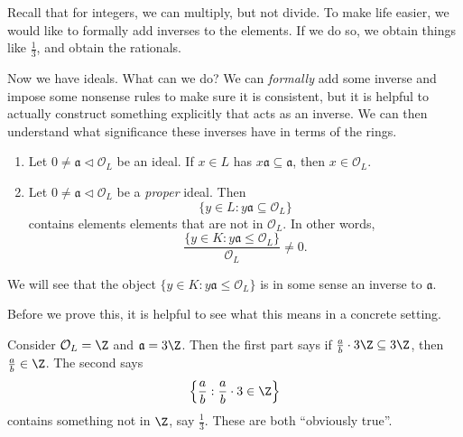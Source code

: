 \documentclass[a4paper]{article}
\begin{document}
Recall that for integers, we can multiply, but not divide. To make life easier, we would like to formally add inverses to the elements. If we do so, we obtain things like $\frac{1}{3}$, and obtain the rationals.

Now we have ideals. What can we do? We can \emph{formally} add some inverse and impose some nonsense rules to make sure it is consistent, but it is helpful to actually construct something explicitly that acts as an inverse. We can then understand what significance these inverses have in terms of the rings.

\begin{prop}\leavevmode
  \begin{enumerate}
    \item Let $0 \not= \mathfrak{a} \lhd \mathcal{O}_L$ be an ideal. If $x \in L$ has $x\mathfrak{a} \subseteq \mathfrak{a}$, then $x \in \mathcal{O}_L$.
    \item Let $0 \not= \mathfrak{a} \lhd \mathcal{O}_L$ be a \emph{proper} ideal. Then
      \[
        \{y \in L: y \mathfrak{a} \subseteq \mathcal{O}_L\}
      \]
      contains elements elements that are not in $\mathcal{O}_L$. In other words,
      \[
        \frac{\{y \in K: y \mathfrak{a} \leq \mathcal{O}_L\}}{\mathcal{O}_L} \not = 0.
      \]
  \end{enumerate}
\end{prop}
We will see that the object $\{y \in K: y \mathfrak{a} \leq \mathcal{O}_L\}$ is in some sense an inverse to $\mathfrak{a}$.

Before we prove this, it is helpful to see what this means in a concrete setting.
\begin{eg}
  Consider $\mathcal{O}_L = \Z$ and $\mathfrak{a} = 3\Z$. Then the first part says if $\frac{a}{b} \cdot 3\Z \subseteq 3\Z$, then $\frac{a}{b} \in \Z$. The second says
  \[
    \left\{\frac{a}{b}: \frac{a}{b}\cdot 3 \in \Z\right\}
  \]
  contains something not in $\Z$, say $\frac{1}{3}$. These are both ``obviously true''.
\end{eg}
\end{document}
